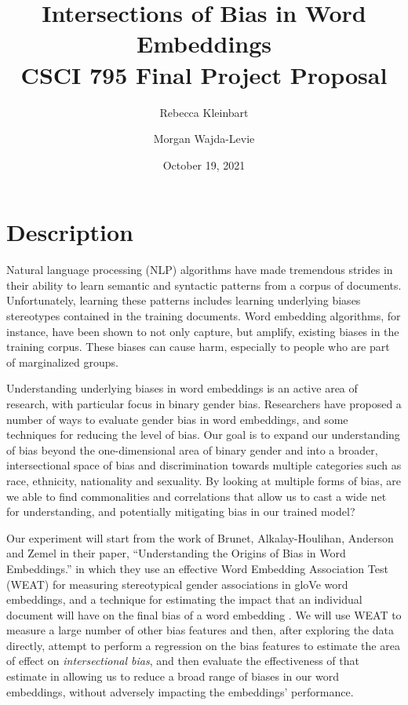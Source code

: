 \documentclass{article}
\title{Intersections of Bias in Word Embeddings\\
    \Large{CSCI 795 Final Project Proposal}}
\date{October 19, 2021}
\author{Rebecca Kleinbart \and Morgan Wajda-Levie}
\begin{document}
\maketitle

\section{Description}

Natural language processing (NLP) algorithms have made tremendous strides in
their ability to learn semantic and syntactic patterns from a corpus of
documents. Unfortunately, learning these patterns includes learning underlying
biases stereotypes contained in the training documents. Word embedding
algorithms, for instance, have been shown to not only capture, but
amplify, existing biases in the training
corpus\cite{caliskan_semantics_2017}. These biases can cause harm,
especially to people who are part of marginalized groups.

Understanding underlying biases in word embeddings is an active area of
research, with particular focus in binary gender bias. Researchers have
proposed a number of ways to evaluate gender bias in word embeddings,
and some techniques for reducing the level of
bias\cite{caliskan_semantics_2017, brunet_understanding_2019,
gonen_lipstick_2019, badilla_wefe_2020}. Our goal is to
expand our understanding of bias beyond the one-dimensional area of
binary gender and into a broader, intersectional space of bias and
discrimination towards multiple categories such as race, ethnicity,
nationality and sexuality. By looking at multiple forms of bias, are we
able to find commonalities and correlations that allow us to cast a wide
net for understanding, and potentially mitigating bias in our trained
model?

Our experiment will start from the work of Brunet, Alkalay-Houlihan,
Anderson and Zemel in their paper, ``Understanding the Origins of Bias
in Word Embeddings.'' in which they use an effective Word Embedding
Association Test (WEAT) for measuring stereotypical gender associations
in gloVe word embeddings, and a technique for estimating the impact that
an individual document will have on the final bias of a word embedding%
\cite{brunet_understanding_2019}.  We will use WEAT to measure a large
number of other bias features and then, after exploring the data
directly, attempt to perform a regression on the bias features to
estimate the area of effect on \emph{intersectional bias}, and then
evaluate the effectiveness of that estimate in allowing us to reduce a
broad range of biases in our word embeddings, without adversely
impacting the embeddings' performance.
\end{document}
